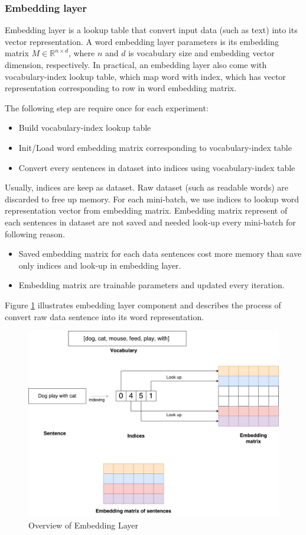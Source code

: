\subsubsection{Embedding layer}\label{sec:embedding}
Embedding layer is a lookup table that convert input data (such as text) into its vector representation. A word embedding layer parameters is its embedding matrix $M  \in \mathbb{R}^{n \times d}$, where $n$ and $d$ is vocabulary size and embedding vector dimension, respectively. In practical, an embedding layer also come with vocabulary-index lookup table, which map word with index, which has vector representation corresponding to row in word embedding matrix.
  
The following step are require once for each experiment:
\begin{itemize}
	\item Build vocabulary-index lookup table
	\item Init/Load word embedding matrix corresponding to vocabulary-index table
	\item Convert every sentences in dataset into indices using vocabulary-index table  
\end{itemize}
Usually, indices are keep as dataset. Raw dataset (such as readable words) are discarded to free up memory. For each mini-batch, we use indices to lookup word representation vector from embedding matrix. Embedding matrix represent of each sentences in dataset are not saved and needed look-up every mini-batch for following reason.
\begin{itemize}
	\item Saved embedding matrix for each data sentences cost more memory than save only indices and look-up in embedding layer.
	\item Embedding matrix are trainable parameters and updated every iteration.
\end{itemize}

Figure \ref{fig:embeddinglayer} illustrates embedding layer component and describes the process of convert raw data sentence into its word representation.

\begin{figure}[H]
	\centering
	\includegraphics[width=0.9\linewidth]{figure/embeddinglayer.pdf}
	\caption[Overview of embedding layer]{Overview of Embedding Layer}
	\label{fig:embeddinglayer}
\end{figure}



